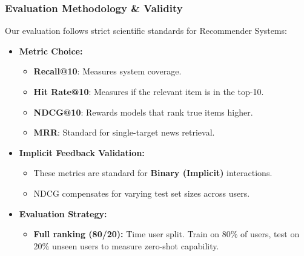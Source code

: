 \documentclass{beamer}
\begin{document}
\begin{frame}
    \frametitle{Evaluation Methodology \& Validity}
    Our evaluation follows strict scientific standards for Recommender Systems:

    \vspace{0.3cm}
    \begin{itemize}
        \item \textbf{Metric Choice:}
              \begin{itemize}
                  \item \textbf{Recall@10}: Measures system coverage.
                  \item \textbf{Hit Rate@10}: Measures if the relevant item is in the top-10.
                  \item \textbf{NDCG@10}: Rewards models that rank true items higher.
                  \item \textbf{MRR}: Standard for single-target news retrieval.
              \end{itemize}
        \item \textbf{Implicit Feedback Validation:}
              \begin{itemize}
                  \item These metrics are standard for \textbf{Binary (Implicit)} interactions.
                  \item NDCG compensates for varying test set sizes across users.
              \end{itemize}
        \item \textbf{Evaluation Strategy:}
              \begin{itemize}
                  \item \textbf{Full ranking (80/20):} Time user split. Train on 80\% of users, test on 20\% unseen users to measure zero-shot capability.
              \end{itemize}
    \end{itemize}
\end{frame}
\end{document}
